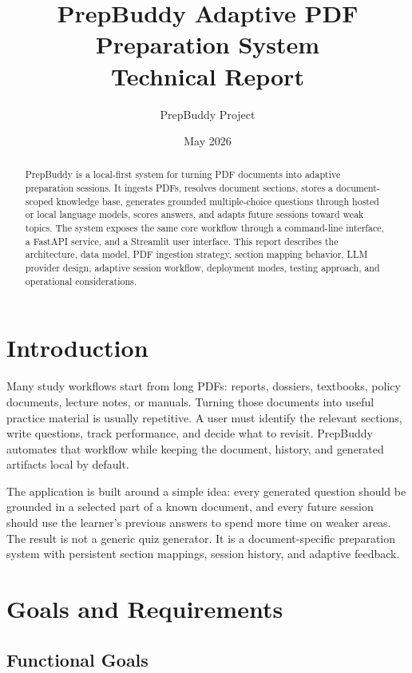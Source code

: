 \documentclass[11pt]{article}
\title{\textbf{PrepBuddy Adaptive PDF Preparation System}\\Technical Report}
\author{PrepBuddy Project}
\date{May 2026}
\begin{document}
\maketitle

\begin{abstract}
PrepBuddy is a local-first system for turning PDF documents into adaptive preparation sessions. It ingests PDFs, resolves document sections, stores a document-scoped knowledge base, generates grounded multiple-choice questions through hosted or local language models, scores answers, and adapts future sessions toward weak topics. The system exposes the same core workflow through a command-line interface, a FastAPI service, and a Streamlit user interface. This report describes the architecture, data model, PDF ingestion strategy, section mapping behavior, LLM provider design, adaptive session workflow, deployment modes, testing approach, and operational considerations.
\end{abstract}

\tableofcontents
\newpage

\section{Introduction}

Many study workflows start from long PDFs: reports, dossiers, textbooks, policy documents, lecture notes, or manuals. Turning those documents into useful practice material is usually repetitive. A user must identify the relevant sections, write questions, track performance, and decide what to revisit. PrepBuddy automates that workflow while keeping the document, history, and generated artifacts local by default.

The application is built around a simple idea: every generated question should be grounded in a selected part of a known document, and every future session should use the learner's previous answers to spend more time on weaker areas. The result is not a generic quiz generator. It is a document-specific preparation system with persistent section mappings, session history, and adaptive feedback.

\section{Goals and Requirements}

\subsection{Functional Goals}
\end{document}
